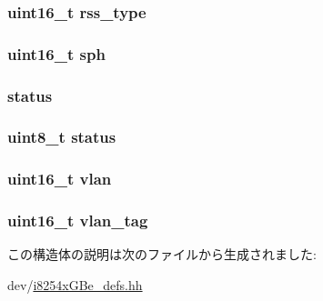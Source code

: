 \label{structiGbReg_1_1RxDesc_af242adf0e963722138ee2289d97749c4}
\hypertarget{structiGbReg_1_1RxDesc_a34dd3a620cd39dd7a33114c2418944c7}{
\subsubsection[{rss\_\-type}]{\setlength{\rightskip}{0pt plus 5cm}uint16\_\-t {\bf rss\_\-type}}}
\label{structiGbReg_1_1RxDesc_a34dd3a620cd39dd7a33114c2418944c7}
\hypertarget{structiGbReg_1_1RxDesc_ad73fb49ed137b8c1ff6b72ad623575b2}{
\subsubsection[{sph}]{\setlength{\rightskip}{0pt plus 5cm}uint16\_\-t {\bf sph}}}
\label{structiGbReg_1_1RxDesc_ad73fb49ed137b8c1ff6b72ad623575b2}
\hypertarget{structiGbReg_1_1RxDesc_ade20423e91627f07e610924cb0081623}{
\subsubsection[{status}]{ {\bf status}}}
\label{structiGbReg_1_1RxDesc_ade20423e91627f07e610924cb0081623}
\hypertarget{structiGbReg_1_1RxDesc_ade818037fd6c985038ff29656089758d}{
\subsubsection[{status}]{\setlength{\rightskip}{0pt plus 5cm}uint8\_\-t {\bf status}}}
\label{structiGbReg_1_1RxDesc_ade818037fd6c985038ff29656089758d}
\hypertarget{structiGbReg_1_1RxDesc_a92937e69e9229d22ff399ab3dc050fd2}{
\subsubsection[{vlan}]{\setlength{\rightskip}{0pt plus 5cm}uint16\_\-t {\bf vlan}}}
\label{structiGbReg_1_1RxDesc_a92937e69e9229d22ff399ab3dc050fd2}
\hypertarget{structiGbReg_1_1RxDesc_ab41c06306dfcedac23a7ae229d0f540e}{
\subsubsection[{vlan\_\-tag}]{\setlength{\rightskip}{0pt plus 5cm}uint16\_\-t {\bf vlan\_\-tag}}}
\label{structiGbReg_1_1RxDesc_ab41c06306dfcedac23a7ae229d0f540e}


この構造体の説明は次のファイルから生成されました:\begin{DoxyCompactItemize}
\item 
dev/\hyperlink{i8254xGBe__defs_8hh}{i8254xGBe\_\-defs.hh}\end{DoxyCompactItemize}
